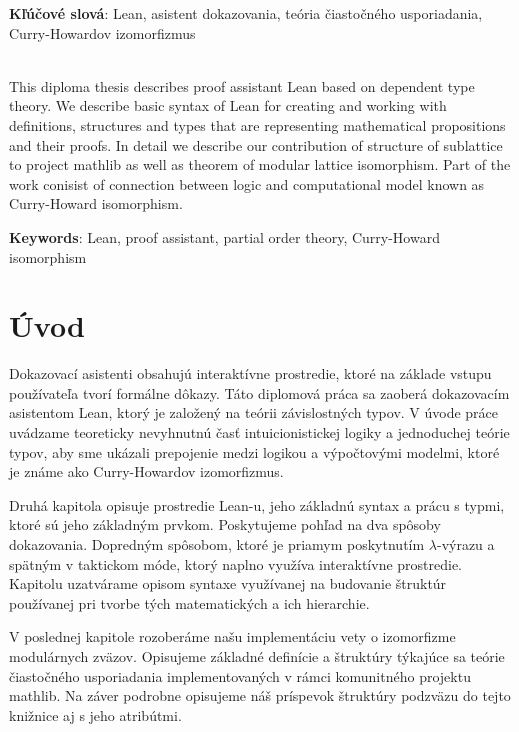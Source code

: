 \documentclass[a4paper,10pt,oneside]{report}%
\begin{document}
    \textbf{Kľúčové slová}: Lean, asistent dokazovania, teória čiastočného usporiadania, Curry-Howardov izomorfizmus

~\\

    This diploma thesis describes proof assistant Lean based on dependent type theory.
    We describe basic syntax of Lean for creating and working with definitions, structures and
types that are representing mathematical propositions and their proofs.
    In detail we describe our contribution of structure of sublattice to project mathlib
as well as theorem of modular lattice isomorphism.
    Part of the work conisist of connection between logic and computational model
known as Curry-Howard isomorphism.

    \textbf{Keywords}: Lean, proof assistant, partial order theory, Curry-Howard isomorphism

\newpage

\tableofcontents

\newpage

\chapter{Úvod}
    Dokazovací asistenti obsahujú interaktívne prostredie, ktoré na základe vstupu
používateľa tvorí formálne dôkazy.
    Táto diplomová práca sa zaoberá dokazovacím asistentom Lean, ktorý je
založený na teórii závislostných typov.
    V úvode práce uvádzame teoreticky nevyhnutnú časť intuicionistickej logiky
a jednoduchej teórie typov, aby sme ukázali prepojenie medzi logikou a výpočtovými
modelmi, ktoré je známe ako Curry-Howardov izomorfizmus.

    Druhá kapitola opisuje prostredie Lean-u, jeho základnú syntax a prácu s 
typmi, ktoré sú jeho základným prvkom.
    Poskytujeme pohľad na dva spôsoby dokazovania. Dopredným spôsobom, ktoré je priamym poskytnutím $\lambda$-výrazu a spätným v taktickom móde, ktorý naplno využíva interaktívne prostredie.
    Kapitolu uzatvárame opisom syntaxe využívanej na budovanie štruktúr používanej
pri tvorbe tých matematických a ich hierarchie.

    V poslednej kapitole rozoberáme našu implementáciu vety o izomorfizme modulárnych
zväzov.
    Opisujeme základné definície a štruktúry týkajúce sa teórie čiastočného usporiadania
implementovaných v rámci komunitného projektu mathlib.
    Na záver podrobne opisujeme náš príspevok štruktúry podzväzu do tejto knižnice aj s jeho atribútmi.
\end{document}
